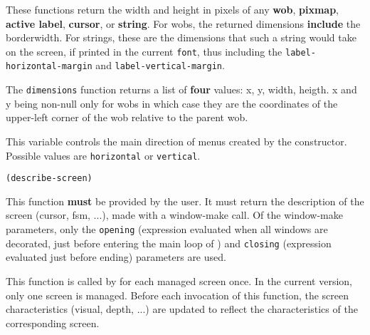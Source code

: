 These functions return the width and height in pixels of any {\bf wob}, {\bf
pixmap}, {\bf active label}, {\bf cursor}, or {\bf string}.  For wobs, the
returned dimensions {\bf include} the borderwidth. For strings, these are the
dimensions that such a string would take on the screen, if printed in the
current {\tt font}, thus including the \verb"label-horizontal-margin" and
\verb"label-vertical-margin".

The \verb"dimensions" function returns a list of {\bf four} values: x, y,
width, heigth. x and y being non-null only for wobs in which case they are
the coordinates of the upper-left corner of the wob relative to the parent
wob.



This variable controls the main direction of menus created by the
 constructor. Possible values are \verb"horizontal"
or \verb"vertical".

        
{\usagefont\begin{verbatim}
(describe-screen)
\end{verbatim}}\usageupspace

This function {\bf must} be provided by the user. 
It must return the description of the screen (cursor, fsm, ...), made with a
window-make call. Of the window-make parameters, only the \verb"opening"
(expression evaluated when all windows are decorated, just before entering
the main loop of {\GWM}) and \verb"closing" (expression evaluated just before
ending) parameters are used. 


This function is called by {\GWM} for each managed screen once. In the
current version, only one screen is managed. Before each invocation of this
function, the screen characteristics (visual, depth, ...) are updated to
reflect the characteristics of the corresponding screen.


